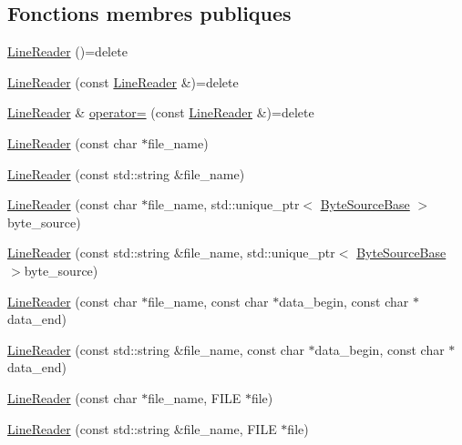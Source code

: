 \subsection*{Fonctions membres publiques}
\begin{DoxyCompactItemize}
\item 
\hyperlink{classio_1_1LineReader_abd9f13fb1d3f5d36857dec0a1d1bde6c}{Line\+Reader} ()=delete
\item 
\hyperlink{classio_1_1LineReader_a84f2957de769bb701eaaddfd8bc004dd}{Line\+Reader} (const \hyperlink{classio_1_1LineReader}{Line\+Reader} \&)=delete
\item 
\hyperlink{classio_1_1LineReader}{Line\+Reader} \& \hyperlink{classio_1_1LineReader_a9ebd7beca16060ffc0ea8df3c0c6ff25}{operator=} (const \hyperlink{classio_1_1LineReader}{Line\+Reader} \&)=delete
\item 
\hyperlink{classio_1_1LineReader_a81a75d3f53725d35822f490007520e29}{Line\+Reader} (const char $\ast$file\+\_\+name)
\item 
\hyperlink{classio_1_1LineReader_ab0eb26f44fa6b18f9c39dfb2561ac882}{Line\+Reader} (const std\+::string \&file\+\_\+name)
\item 
\hyperlink{classio_1_1LineReader_af4ebb130a7d6c78356573f6d0304266c}{Line\+Reader} (const char $\ast$file\+\_\+name, std\+::unique\+\_\+ptr$<$ \hyperlink{classio_1_1ByteSourceBase}{Byte\+Source\+Base} $>$byte\+\_\+source)
\item 
\hyperlink{classio_1_1LineReader_ab625b3a8001dca811b0e211c6cfc1b28}{Line\+Reader} (const std\+::string \&file\+\_\+name, std\+::unique\+\_\+ptr$<$ \hyperlink{classio_1_1ByteSourceBase}{Byte\+Source\+Base} $>$byte\+\_\+source)
\item 
\hyperlink{classio_1_1LineReader_ad5a65d6f23474884061a77ea858c042b}{Line\+Reader} (const char $\ast$file\+\_\+name, const char $\ast$data\+\_\+begin, const char $\ast$data\+\_\+end)
\item 
\hyperlink{classio_1_1LineReader_a0a52d864b46442a253443cac1367366e}{Line\+Reader} (const std\+::string \&file\+\_\+name, const char $\ast$data\+\_\+begin, const char $\ast$data\+\_\+end)
\item 
\hyperlink{classio_1_1LineReader_ad2a8943ba0848ae5052e2f5ad30c010e}{Line\+Reader} (const char $\ast$file\+\_\+name, F\+I\+LE $\ast$file)
\item 
\hyperlink{classio_1_1LineReader_a93fa2e3ae98b0e7a7391714d6395c552}{Line\+Reader} (const std\+::string \&file\+\_\+name, F\+I\+LE $\ast$file)
\item 

\end{DoxyCompactItemize}
